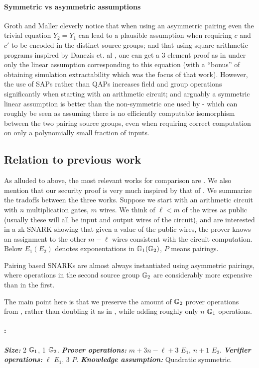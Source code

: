 \documentclass[11pt]{article}
\numberwithin{figure}{section} %
\begin{document}
\paragraph{Symmetric vs asymmetric assumptions}
Groth and Maller \cite{GM17} cleverly notice that when using an asymmetric pairing
even the trivial equation $Y_2=Y_1$ can lead to a plausible assumption when requiring $c$ and $c'$ to be encoded in the distinct source groups;
and that using square arithmetic programs inspired by Danezis et. al \cite{DFGK14}, one can get a 3 element proof as in \cite{Groth16} under only the linear assumption corresponding to this equation (with a ``bonus'' of obtaining simulation extractability which was the focus of that work). However, the use of SAPs rather than QAPs increases field and group operations significantly when starting with an arithmetic circuit; and arguably a symmetric linear assumption is better than the non-symmetric one used by \cite{GM17} - which can roughly be seen as assuming there is no efficiently computable isomorphism between the two pairing source groups, even when requiring correct computation on only a polynomially small fraction of inputs.


\subsection{Relation to previous work}
As alluded to above, the most relevant works for comparison are \cite{Groth16,GM17}.
We also mention that our security proof is very much inspired by that of \cite{GM17}.
We summarize the tradoffs between the three works.
Suppose we start with an arithmetic circuit with $n$ multiplication gates, $m$ wires.
We think of $\ell<m$ of the wires as public (usually these will all be input and output wires of the circuit), and are interested in a zk-SNARK showing
that given a value \inp of the public wires, the prover knows an assignment to the other $m-\ell$ wires consistent with the circuit computation.
Below $E_1 (E_2)$ denotes exponentations in ${\mathbb G}_1 ({\mathbb G}_2)$, $P$ means pairings.

Pairing based SNARKs are almost always instantiated using asymmetric pairings, where operations in the second source group ${\mathbb G}_2$ are considerably more expensive than in the first.

The main point here is that we preserve the amount of ${\mathbb G}_2$ prover operations from \cite{Groth16}, rather than doubling it as in \cite{GM17}, while adding roughly only $n$ ${\mathbb G}_1$ operations.

 \paragraph{\cite{Groth16}:} \textit{\textbf{Size:}} 2 ${\mathbb G}_1$, 1 ${\mathbb G}_2$.  \textit{\textbf{Prover operations:}} 
 $m+3n-\ell+3$ $E_1$, $n+1$ $E_2$. \textit{\textbf{Verifier operations:}} $\ell$ $E_1$, 3 $P$. \textit{\textbf{Knowledge assumption:}} Quadratic symmetric.
\end{document}
